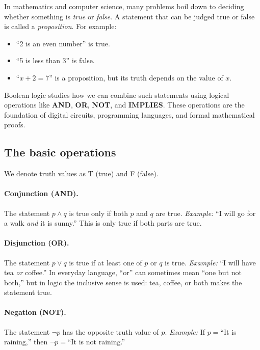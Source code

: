 In mathematics and computer science, many problems boil down to deciding whether something
is \emph{true} or \emph{false}.  
A statement that can be judged true or false is called a \emph{proposition}.  
For example:
\begin{itemize}
  \item ``2 is an even number'' is true.
  \item ``5 is less than 3'' is false.
  \item ``$x+2=7$'' is a proposition, but its truth depends on the value of $x$.
\end{itemize}

Boolean logic studies how we can combine such statements using logical operations 
like \textbf{AND}, \textbf{OR}, \textbf{NOT}, and \textbf{IMPLIES}.  
These operations are the foundation of digital circuits, programming languages, 
and formal mathematical proofs.

\subsection{The basic operations}
We denote truth values as T (true) and F (false).

\paragraph{Conjunction (AND).} 
The statement $p \land q$ is true only if both $p$ and $q$ are true.  
\emph{Example:} ``I will go for a walk \emph{and} it is sunny.''  
This is only true if both parts are true.

\paragraph{Disjunction (OR).}
The statement $p \lor q$ is true if at least one of $p$ or $q$ is true.  
\emph{Example:} ``I will have tea \emph{or} coffee.''  
In everyday language, ``or'' can sometimes mean ``one but not both,'' 
but in logic the inclusive sense is used: tea, coffee, or both makes the statement true.

\paragraph{Negation (NOT).}
The statement $\lnot p$ has the opposite truth value of $p$.  
\emph{Example:} If $p=$``It is raining,'' then $\lnot p=$``It is not raining.''

